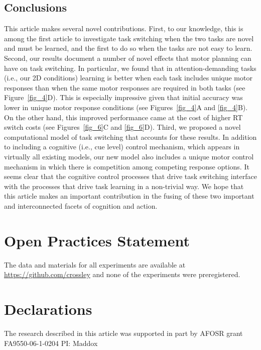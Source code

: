 \documentclass[doc, floatsintext]{apa7}
\begin{document}
\subsection{Conclusions}
This article makes several novel contributions. First, to
our knowledge, this is among the first article to
investigate task switching when the two tasks are novel and
must be learned, and the first to do so when the tasks are
not easy to learn.  Second, our results document a number of
novel effects that motor planning can have on task
switching. In particular, we found that in
attention-demanding tasks (i.e., our 2D conditions) learning
is better when each task includes unique motor responses
than when the same motor responses are required in both
tasks (see Figure~\ref{fig_4}D). This is especially
impressive given that initial accuracy was lower in unique
motor response conditions (see Figures~\ref{fig_4}A and
\ref{fig_4}B). On the other hand, this improved performance
came at the cost of higher RT switch costs (see
Figures~\ref{fig_6}C and \ref{fig_6}D).  Third, we proposed
a novel computational model of task switching that accounts
for these results. In addition to including a cognitive
(i.e., cue level) control mechanism, which appears in
virtually all existing models, our new model also includes a
unique motor control mechanism in which there is competition
among competing response options.  It seems clear that the
cognitive control processes that drive task switching
interface with the processes that drive task learning in a
non-trivial way. We hope that this article makes an
important contribution in the fusing of these two important
and interconnected facets of cognition and action.

\section{Open Practices Statement} 
The data and materials for all experiments are available at
\url{https://github.com/crossley} and none of the
experiments were preregistered.

\section{Declarations}
The research described in this article was supported in part
by AFOSR grant FA9550-06-1-0204 PI: Maddox
\end{document}
